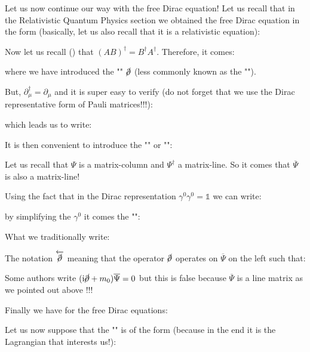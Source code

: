 	Let us now continue our way with the free Dirac equation! Let us recall that in the Relativistic Quantum Physics section we obtained the free Dirac equation in the form (basically, let us also recall that it is a relativistic equation):
	
	Now let us recall () that $(AB)^\dagger=B^\dagger A^\dagger$. Therefore, it comes:
	
	where we have introduced the "" $\cancel{\partial}$ (less commonly known as the "").
	
	But, $\partial_\mu^\dagger=\partial_\mu$ and it is super easy to verify (do not forget that we use the Dirac representative form of Pauli matrices!!!):
	
	which leads us to write:
	
	It is then convenient to introduce the "" or "":
	
	\begin{tcolorbox}[title=Remark,colframe=black,arc=10pt]
	Let us recall that $\Psi$ is a matrix-column and $\Psi^\dagger$ a matrix-line. So it comes that $\overline{\Psi}$ is also a matrix-line!
	\end{tcolorbox}
	Using the fact that in the Dirac representation $\gamma^0 \gamma^0 =\mathds{1}$ we can write:
	
	by simplifying the $\gamma^0$ it comes the "":
	
	What we traditionally write:
	
	The notation $\overleftarrow{\cancel{\partial}}$ meaning that the operator $\cancel{\partial}$ operates on $\overline{\Psi}$ on the left such that:
	
	\begin{tcolorbox}[title=Remark,colframe=black,arc=10pt]
	Some authors write $(\mathrm{i}\cancel{\partial}+m_0)\overline{\Psi}=0$ but this is false because $\overline{\Psi}$ is a line matrix as we pointed out above !!!
	\end{tcolorbox}
	Finally we have for the free Dirac equations:
	
	Let us now suppose that the "" is of the form (because in the end it is the Lagrangian that interests us!):
	
